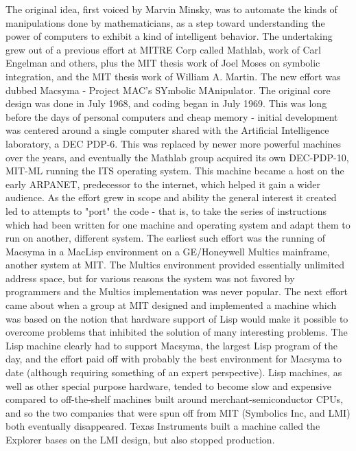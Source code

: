 The original idea, first voiced by Marvin Minsky, was to automate the kinds 
of manipulations done by mathematicians, as a step toward understanding the
power of computers to exhibit a kind of intelligent behavior. \cite{MAC-M-124}
The undertaking grew out of a previous effort at MITRE Corp called Mathlab, 
work of Carl Engelman and others, plus the MIT thesis work of Joel Moses on 
symbolic integration, and the MIT thesis work of William A. Martin. The new
effort was dubbed Macsyma - Project MAC's SYmbolic MAnipulator. The original 
core design was done in July 1968, and coding began in July 1969. This was long
before the days of personal computers and cheap memory - initial development 
was centered around a single computer shared with the Artificial Intelligence 
laboratory, a DEC PDP-6.  This was replaced by newer more powerful machines 
over the years, and eventually the Mathlab group acquired its own DEC-PDP-10, 
MIT-ML running the ITS operating system. This machine became a host on the 
early ARPANET, predecessor to the internet, which helped it gain a
wider audience. As the effort grew in scope and ability the general
interest it created led to attempts to "port" the code - that is, to
take the series of instructions which had been written for one machine
and operating system and adapt them to run on another, different 
system. The earliest such effort was the running of Macsyma in a MacLisp 
environment on a GE/Honeywell Multics mainframe, another system
at MIT. The Multics environment provided essentially unlimited address
space, but for various reasons the system was not favored by 
programmers and the Multics implementation was never popular.
The next effort came about when a group at MIT designed and implemented a machine
which was based on the notion that hardware support of Lisp would make
it possible to overcome problems that inhibited the solution of
many interesting problems.  The Lisp machine clearly had to support 
Macsyma, the largest Lisp program of the day, and the effort paid off with 
probably the best environment for Macsyma to date (although requiring something
of an expert perspective).  Lisp machines, as well as other special
purpose hardware, tended to become slow and expensive compared to
off-the-shelf machines built around merchant-semiconductor CPUs, and
so the two companies that were spun off from MIT (Symbolics Inc, and 
LMI) both eventually disappeared.  Texas Instruments built a machine called
the Explorer bases on the LMI design, but also stopped production.

